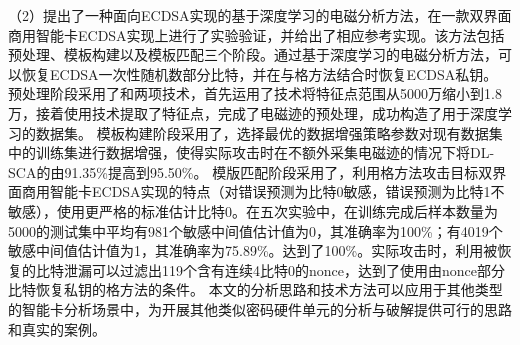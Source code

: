 {	
	（2）提出了一种面向ECDSA实现的基于深度学习的电磁分析方法，在一款双界面商用智能卡ECDSA实现上进行了实验验证，并给出了相应参考实现。该方法包括预处理、模板构建以及模板匹配三个阶段。通过基于深度学习的电磁分析方法，可以恢复ECDSA一次性随机数部分比特，并在与格方法结合时恢复ECDSA私钥。
	预处理阶段采用了\poifanwei 和\yuchuli 两项技术，首先运用了\poifanwei 技术将特征点范围从5000万缩小到1.8万，接着使用\yuchuli 技术提取了特征点，完成了电磁迹的预处理，成功构造了用于深度学习的数据集。
	模板构建阶段采用了\shujuzengqiang，选择最优的数据增强策略参数对现有数据集中的训练集进行数据增强，使得实际攻击时在不额外采集电磁迹的情况下将DL-SCA的\zyx 由91.35\%提高到95.50\%。
	模版匹配阶段采用了\jiashejianyanguji ，利用格方法攻击目标双界面商用智能卡ECDSA实现的特点（对错误预测为比特0敏感，错误预测为比特1不敏感），使用更严格的标准估计比特0。在五次实验中，在训练完成后样本数量为5000的测试集中平均有981个敏感中间值估计值为0，其准确率为100\%；有4019个敏感中间值估计值为1，其准确率为75.89\%。\zyx 达到了100\%。实际攻击时，利用被恢复的比特泄漏可以过滤出119个含有连续4比特0的nonce，达到了使用由nonce部分比特恢复私钥的格方法的条件。
	本文的分析思路和技术方法可以应用于其他类型的智能卡分析场景中，为开展其他类似密码硬件单元的分析与破解提供可行的思路和真实的案例。
	
	
}

